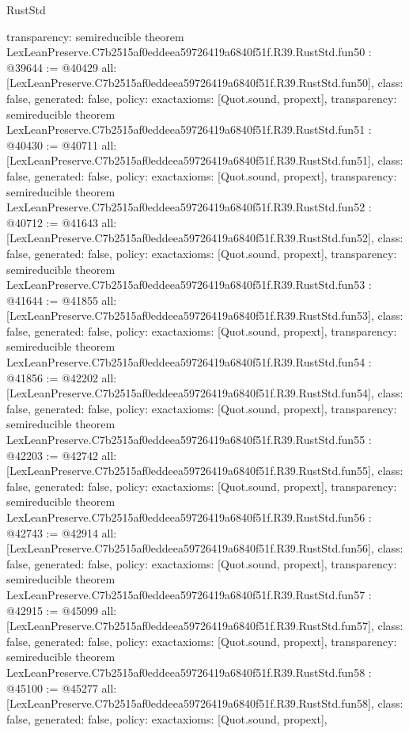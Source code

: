 \begin{lexlean}{RustStd}
\begin{coremodule}
{  transparency: semireducible
}
theorem LexLeanPreserve.C7b2515af0eddeea59726419a6840f51f.R39.RustStd.fun50 : @39644 := @40429 {
  all: [LexLeanPreserve.C7b2515af0eddeea59726419a6840f51f.R39.RustStd.fun50],
  class: false,
  generated: false,
  policy: exact{axioms: [Quot.sound, propext]},
  transparency: semireducible
}
theorem LexLeanPreserve.C7b2515af0eddeea59726419a6840f51f.R39.RustStd.fun51 : @40430 := @40711 {
  all: [LexLeanPreserve.C7b2515af0eddeea59726419a6840f51f.R39.RustStd.fun51],
  class: false,
  generated: false,
  policy: exact{axioms: [Quot.sound, propext]},
  transparency: semireducible
}
theorem LexLeanPreserve.C7b2515af0eddeea59726419a6840f51f.R39.RustStd.fun52 : @40712 := @41643 {
  all: [LexLeanPreserve.C7b2515af0eddeea59726419a6840f51f.R39.RustStd.fun52],
  class: false,
  generated: false,
  policy: exact{axioms: [Quot.sound, propext]},
  transparency: semireducible
}
theorem LexLeanPreserve.C7b2515af0eddeea59726419a6840f51f.R39.RustStd.fun53 : @41644 := @41855 {
  all: [LexLeanPreserve.C7b2515af0eddeea59726419a6840f51f.R39.RustStd.fun53],
  class: false,
  generated: false,
  policy: exact{axioms: [Quot.sound, propext]},
  transparency: semireducible
}
theorem LexLeanPreserve.C7b2515af0eddeea59726419a6840f51f.R39.RustStd.fun54 : @41856 := @42202 {
  all: [LexLeanPreserve.C7b2515af0eddeea59726419a6840f51f.R39.RustStd.fun54],
  class: false,
  generated: false,
  policy: exact{axioms: [Quot.sound, propext]},
  transparency: semireducible
}
theorem LexLeanPreserve.C7b2515af0eddeea59726419a6840f51f.R39.RustStd.fun55 : @42203 := @42742 {
  all: [LexLeanPreserve.C7b2515af0eddeea59726419a6840f51f.R39.RustStd.fun55],
  class: false,
  generated: false,
  policy: exact{axioms: [Quot.sound, propext]},
  transparency: semireducible
}
theorem LexLeanPreserve.C7b2515af0eddeea59726419a6840f51f.R39.RustStd.fun56 : @42743 := @42914 {
  all: [LexLeanPreserve.C7b2515af0eddeea59726419a6840f51f.R39.RustStd.fun56],
  class: false,
  generated: false,
  policy: exact{axioms: [Quot.sound, propext]},
  transparency: semireducible
}
theorem LexLeanPreserve.C7b2515af0eddeea59726419a6840f51f.R39.RustStd.fun57 : @42915 := @45099 {
  all: [LexLeanPreserve.C7b2515af0eddeea59726419a6840f51f.R39.RustStd.fun57],
  class: false,
  generated: false,
  policy: exact{axioms: [Quot.sound, propext]},
  transparency: semireducible
}
theorem LexLeanPreserve.C7b2515af0eddeea59726419a6840f51f.R39.RustStd.fun58 : @45100 := @45277 {
  all: [LexLeanPreserve.C7b2515af0eddeea59726419a6840f51f.R39.RustStd.fun58],
  class: false,
  generated: false,
  policy: exact{axioms: [Quot.sound, propext]},
}
\end{coremodule}
\end{lexlean}
